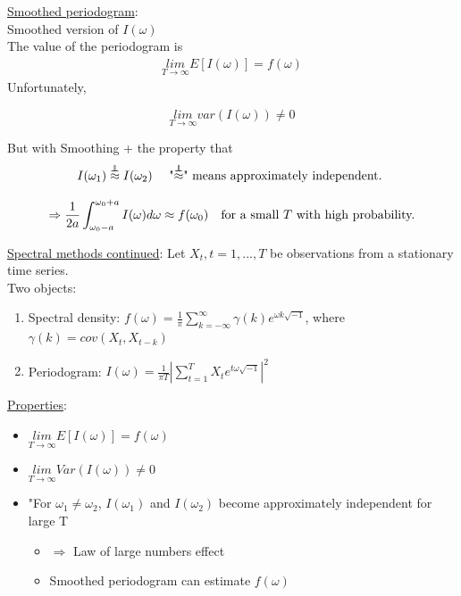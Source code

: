 \underline{Smoothed periodogram}:  \\

Smoothed version of $I(\omega)$\\

The value of the periodogram is 
\begin{align*}
    \underset{T\rightarrow\infty}{lim} E\left[I(\omega) \right] = f(\omega)
\end{align*}
Unfortunately, 

\[\underset{T \rightarrow \infty}{lim} var(I(\omega)) \neq 0 \]

But with Smoothing + the property that 
\[I(\omega_1) \overset{\ind}{\approx} I(\omega_2) \text{
\quad "$\overset{\ind}{\approx}$" means approximately independent. 
} \]


\[\Rightarrow \frac{1}{2a} \int_{\omega_0 - a}^{\omega_0 + a} I(\omega)d\omega \approx f(\omega_0) \text{\quad for a small $T$ with high probability.}\]



\underline{Spectral methods continued}:
\bigskip
Let $X_t, t=1,...,T$ be observations from a stationary time series. \\

Two objects:
\begin{enumerate}
    \item Spectral density: $f(\omega)=\frac{1}{\pi} \sum_{k=-\infty}^\infty \gamma(k) e^{\omega k \sqrt{-1}}$, where $\gamma(k) = cov(X_t, X_{t-k})$
    \item Periodogram: $I(\omega) = \frac{1}{\pi T} \left| \sum_{t=1}^T X_t e^{t\omega \sqrt{-1}} \right|^2$
\end{enumerate}

\underline{Properties}: 
\begin{itemize}
    \item $\underset{T\rightarrow\infty}{lim} E\left[I(\omega) \right] = f(\omega)$ 
    \item $\underset{T\rightarrow\infty}{lim} Var(I(\omega))\neq0$
    \item "For $\omega_1 \neq \omega_2$, $I(\omega_1)$ and $I(\omega_2)$ become approximately independent for large T
    \begin{itemize}
        \item[] $\Rightarrow$ Law of large numbers effect
        \item[] Smoothed periodogram can estimate $f(\omega)$ 
    \end{itemize}
\end{itemize}

